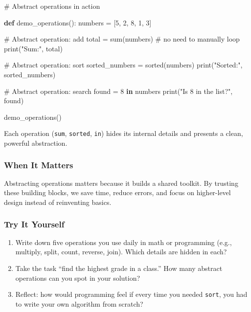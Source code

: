 \documentclass[
  letterpaper,
  DIV=11,
  numbers=noendperiod]{scrreprt}
\newenvironment{Shaded}{\begin{snugshade}}{\end{snugshade}}
\newcommand{\BuiltInTok}[1]{\textcolor[rgb]{0.00,0.23,0.31}{#1}}
\newcommand{\CommentTok}[1]{\textcolor[rgb]{0.37,0.37,0.37}{#1}}
\newcommand{\DecValTok}[1]{\textcolor[rgb]{0.68,0.00,0.00}{#1}}
\newcommand{\KeywordTok}[1]{\textcolor[rgb]{0.00,0.23,0.31}{\textbf{#1}}}
\newcommand{\NormalTok}[1]{\textcolor[rgb]{0.00,0.23,0.31}{#1}}
\newcommand{\OperatorTok}[1]{\textcolor[rgb]{0.37,0.37,0.37}{#1}}
\newcommand{\StringTok}[1]{\textcolor[rgb]{0.13,0.47,0.30}{#1}}
\providecommand{\tightlist}{%
  \setlength{\itemsep}{0pt}\setlength{\parskip}{0pt}}
\begin{document}
\begin{Shaded}
\begin{Highlighting}[]
\CommentTok{\# Abstract operations in action}

\KeywordTok{def}\NormalTok{ demo\_operations():}
\NormalTok{    numbers }\OperatorTok{=}\NormalTok{ [}\DecValTok{5}\NormalTok{, }\DecValTok{2}\NormalTok{, }\DecValTok{8}\NormalTok{, }\DecValTok{1}\NormalTok{, }\DecValTok{3}\NormalTok{]}

    \CommentTok{\# Abstract operation: add}
\NormalTok{    total }\OperatorTok{=} \BuiltInTok{sum}\NormalTok{(numbers)   }\CommentTok{\# no need to manually loop}
    \BuiltInTok{print}\NormalTok{(}\StringTok{"Sum:"}\NormalTok{, total)}

    \CommentTok{\# Abstract operation: sort}
\NormalTok{    sorted\_numbers }\OperatorTok{=} \BuiltInTok{sorted}\NormalTok{(numbers)}
    \BuiltInTok{print}\NormalTok{(}\StringTok{"Sorted:"}\NormalTok{, sorted\_numbers)}

    \CommentTok{\# Abstract operation: search}
\NormalTok{    found }\OperatorTok{=} \DecValTok{8} \KeywordTok{in}\NormalTok{ numbers}
    \BuiltInTok{print}\NormalTok{(}\StringTok{"Is 8 in the list?"}\NormalTok{, found)}

\NormalTok{demo\_operations()}
\end{Highlighting}
\end{Shaded}

Each operation (\texttt{sum}, \texttt{sorted}, \texttt{in}) hides its
internal details and presents a clean, powerful abstraction.

\subsubsection{When It Matters}\label{when-it-matters-41}

Abstracting operations matters because it builds a shared toolkit. By
trusting these building blocks, we save time, reduce errors, and focus
on higher-level design instead of reinventing basics.

\subsubsection{Try It Yourself}\label{try-it-yourself-43}

\begin{enumerate}
\def\labelenumi{\arabic{enumi}.}
\tightlist
\item
  Write down five operations you use daily in math or programming (e.g.,
  multiply, split, count, reverse, join). Which details are hidden in
  each?
\item
  Take the task ``find the highest grade in a class.'' How many abstract
  operations can you spot in your solution?
\item
  Reflect: how would programming feel if every time you needed
  \texttt{sort}, you had to write your own algorithm from scratch?
\end{enumerate}
\end{document}
